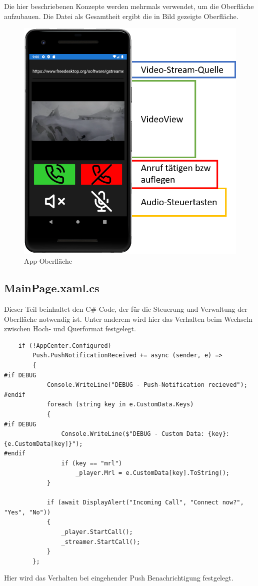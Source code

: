 Die hier beschriebenen Konzepte werden mehrmals verwendet, um die Oberfläche aufzubauen. Die Datei als Gesamtheit ergibt die in Bild  gezeigte Oberfläche.
\begin{figure}
    \centering\includegraphics[width=.7\linewidth]{images/xamarin/MainPage.png}
    \caption{App-Oberfläche}
    \label{fig:mainpage}
\end{figure}

\subsection{MainPage.xaml.cs}
\label{ssec:mainpage-xaml-cs}
Dieser Teil beinhaltet den C\#-Code, der für die Steuerung und Verwaltung der Oberfläche notwendig ist.
Unter anderem wird hier das Verhalten beim Wechseln zwischen Hoch- und Querformat festgelegt.
\begin{verbatim}
    if (!AppCenter.Configured)
        Push.PushNotificationReceived += async (sender, e) =>
        {
#if DEBUG
            Console.WriteLine("DEBUG - Push-Notification recieved");
#endif
            foreach (string key in e.CustomData.Keys)
            {
#if DEBUG
                Console.WriteLine($"DEBUG - Custom Data: {key}:{e.CustomData[key]}");
#endif
                if (key == "mrl")
                    _player.Mrl = e.CustomData[key].ToString();
            }

            if (await DisplayAlert("Incoming Call", "Connect now?", "Yes", "No"))
            {
                _player.StartCall();
                _streamer.StartCall();
            }
        };
\end{verbatim}
Hier wird das Verhalten bei eingehender Push Benachrichtigung festgelegt.
